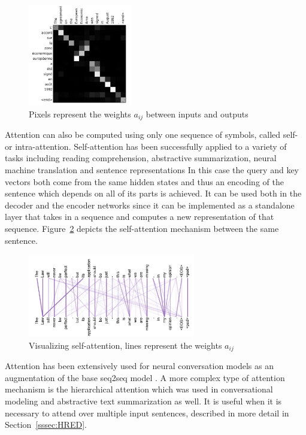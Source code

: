 \documentclass[12pt]{article}
\begin{document}
\begin{figure}[H]
	\centering
	\includegraphics[width=0.4\textwidth]{pics/attn_weights.png}
	\caption{Pixels represent the weights \(a_{ij}\) between inputs and outputs \cite{Bahdanau:2014}}
	\label{fig:attentionb}
\end{figure}
Attention can also be computed using only one sequence of symbols, called self- or intra-attention. Self-attention has been successfully applied to a variety of tasks including reading comprehension, abstractive summarization, neural machine translation and sentence representations \cite{Cheng:2016,Lin:2017,Vaswani:2017,Parikh:2016,Paulus:2017} In this case the query and key vectors both come from the same hidden states and thus an encoding of the sentence which depends on all of its parts is achieved. It can be used both in the decoder and the encoder networks since it can be implemented as a standalone layer that takes in a sequence and computes a new representation of that sequence. Figure~\ref{fig:attentionc} depicts the self-attention mechanism between the same sentence.
\begin{figure}[H]
	\centering
	\includegraphics[width=0.65\textwidth]{pics/self_attn.png}
	\caption{Visualizing self-attention, lines represent the weights \(a_{ij}\) \cite{Vaswani:2017}}
	\label{fig:attentionc}
\end{figure}

Attention has been extensively used for neural conversation models as an augmentation of the base seq2seq model \cite{Yao:2016,Shang:2015,Xing_topic:2017,Zhao:2017}. A more complex type of attention mechanism is the hierarchical attention which was used in conversational modeling \cite{Xing:2017} and abstractive text summarization \cite{Nallapati:2016} as well. It is useful when it is necessary to attend over multiple input sentences, described in more detail in Section~\ref{sssec:HRED}.
\end{document}

